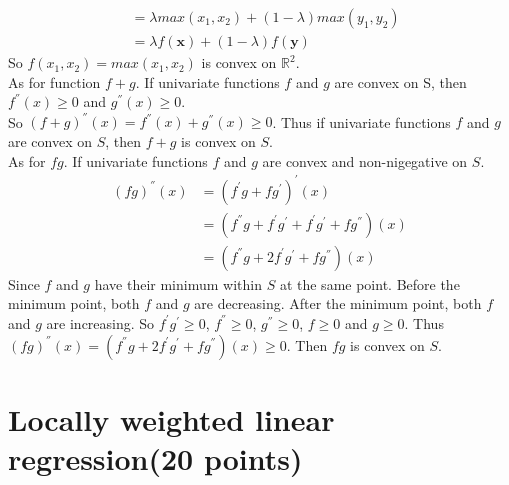 \documentclass{article}
\begin{document}
\begin{itemize}
\begin{align*}
    &= \lambda max(x_{1}, x_{2}) + (1 - \lambda) max(y_{1}, y_{2})\\
    &= \lambda f(\bm{x}) + (1 - \lambda)f(\bm{y})
\end{align*}
So $f(x_{1}, x_{2}) = max(x_{1}, x_{2})$ is convex on $\mathbb{R}^2$.\\
As for function $f + g$. If univariate functions $f$ and $g$ are convex on S, then $ f^{''}(x) \geq 0$ and $ g^{''}(x)\geq 0$.\\
So $(f + g)^{''}(x) = f^{''}(x) + g^{''}(x) \geq 0$. Thus if univariate functions $f$ and $g$ are convex on $S$, then $f + g$ is convex on $S$.\\
As for $fg$. If univariate functions $f$ and $g$ are convex and non-nigegative on $S$.
\begin{align*}
    (fg)^{''}(x) &= (f^{'}g + fg^{'})^{'}(x)\\
    &= (f^{''}g + f^{'}g^{'} + f^{'}g^{'} + fg^{''})(x)\\
    &= (f^{''}g + 2f^{'}g^{'} + f g^{''})(x)
\end{align*}
Since $f$ and $g$ have their minimum within $S$ at the same point. Before the minimum point, both $f$ and $g$ are decreasing. After the minimum point, both $f$ and $g$ are increasing. So $f^{'}g^{'} \geq 0$, $f^{''} \geq 0$, $g^{''} \geq 0$, $f\geq0$ and $g \geq 0$. Thus $(fg)^{''}(x) = (f^{''}g + 2f^{'}g^{'} + f g^{''})(x)\geq 0$. Then $fg$ is convex on $S$.
\end{itemize} 
\section{Locally weighted linear regression(20 points)}
\end{document}
